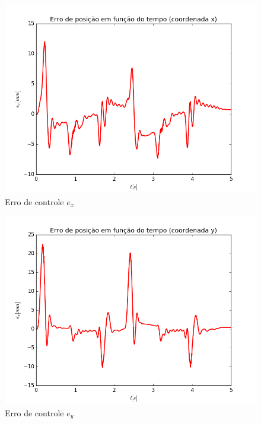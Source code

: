 \documentclass[]{politex}
\begin{document}
\begin{multicols}{2}
\begin{figure}[H]
	\centering
	\includegraphics[scale=0.39]{../../../Experimental/Aquisicoes/PIDSMCt_triangulo/ex.png}  
	\caption{Erro de controle $e_x$}
	\label{fig:PIDSMCq_triangulo_ex}
\end{figure}
\begin{figure}[H]
	\centering
	\includegraphics[scale=0.39]{../../../Experimental/Aquisicoes/PIDSMCt_triangulo/ey.png}  
	\caption{Erro de controle $e_y$}
	\label{fig:PIDSMCq_triangulo_ey}
\end{figure}
\end{multicols}
\end{document}
